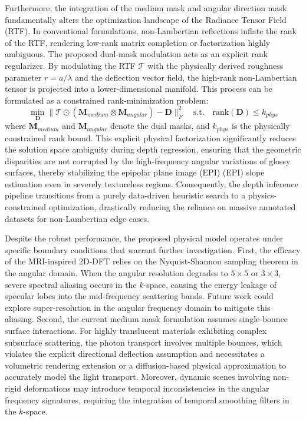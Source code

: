 Furthermore, the integration of the medium mask and angular direction mask fundamentally alters the optimization landscape of the Radiance Tensor Field (RTF). In conventional formulations, non-Lambertian reflections inflate the rank of the RTF, rendering low-rank matrix completion or factorization highly ambiguous. The proposed dual-mask modulation acts as an explicit rank regularizer. By modulating the RTF $\mathcal{T}$ with the physically derived roughness parameter $r = a/\lambda$ and the deflection vector field, the high-rank non-Lambertian tensor is projected into a lower-dimensional manifold. This process can be formulated as a constrained rank-minimization problem:
\begin{equation}
\label{eq:eq34}
\min_{\mathbf{D}} \|\mathcal{T} \odot (\mathbf{M}_{medium} \otimes \mathbf{M}_{angular}) - \mathbf{D}\|_F^2 \quad \text{s.t.} \quad \text{rank}(\mathbf{D}) \le k_{phys}
\end{equation}
where $\mathbf{M}_{medium}$ and $\mathbf{M}_{angular}$ denote the dual masks, and $k_{phys}$ is the physically constrained rank bound. This explicit physical factorization significantly reduces the solution space ambiguity during depth regression, ensuring that the geometric disparities are not corrupted by the high-frequency angular variations of glossy surfaces, thereby stabilizing the epipolar plane image (EPI) (EPI) slope estimation even in severely textureless regions. Consequently, the depth inference pipeline transitions from a purely data-driven heuristic search to a physics-constrained optimization, drastically reducing the reliance on massive annotated datasets for non-Lambertian edge cases.

Despite the robust performance, the proposed physical model operates under specific boundary conditions that warrant further investigation. First, the efficacy of the MRI-inspired 2D-DFT relies on the Nyquist-Shannon sampling theorem in the angular domain. When the angular resolution degrades to $5 \times 5$ or $3 \times 3$, severe spectral aliasing occurs in the $k$-space, causing the energy leakage of specular lobes into the mid-frequency scattering bands. Future work could explore super-resolution in the angular frequency domain to mitigate this aliasing. Second, the current medium mask formulation assumes single-bounce surface interactions. For highly translucent materials exhibiting complex subsurface scattering, the photon transport involves multiple bounces, which violates the explicit directional deflection assumption and necessitates a volumetric rendering extension or a diffusion-based physical approximation to accurately model the light transport. Moreover, dynamic scenes involving non-rigid deformations may introduce temporal inconsistencies in the angular frequency signatures, requiring the integration of temporal smoothing filters in the $k$-space.

